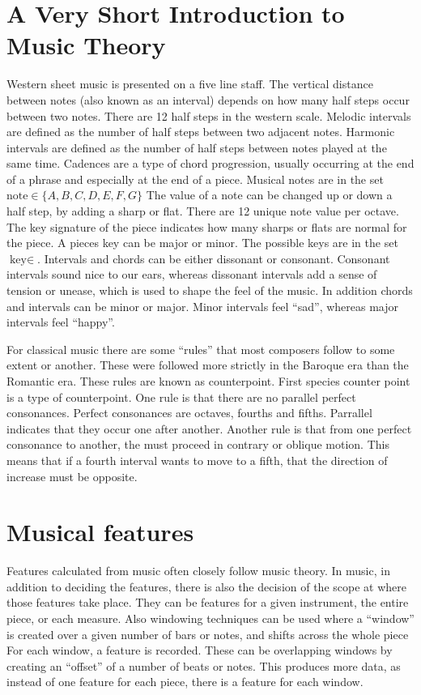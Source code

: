 \documentclass[12pt,twoside]{reedthesis}
\theoremstyle{definition}
\theoremstyle{definition}
\theoremstyle{definition}
\theoremstyle{remark}
\begin{document}
\section{A Very Short Introduction to Music
Theory}\label{a-very-short-introduction-to-music-theory}

Western sheet music is presented on a five line staff. The vertical
distance between notes (also known as an interval) depends on how many
half steps occur between two notes. There are 12 half steps in the
western scale. Melodic intervals are defined as the number of half steps
between two adjacent notes. Harmonic intervals are defined as the number
of half steps between notes played at the same time. Cadences are a type
of chord progression, usually occurring at the end of a phrase and
especially at the end of a piece. Musical notes are in the set
\(\text{note} \in \{A,B,C,D,E,F,G\}\) The value of a note can be changed
up or down a half step, by adding a sharp or flat. There are 12 unique
note value per octave. The key signature of the piece indicates how many
sharps or flats are normal for the piece. A pieces key can be major or
minor. The possible keys are in the set \(\text{key} \in {}\). Intervals
and chords can be either dissonant or consonant. Consonant intervals
sound nice to our ears, whereas dissonant intervals add a sense of
tension or unease, which is used to shape the feel of the music. In
addition chords and intervals can be minor or major. Minor intervals
feel ``sad'', whereas major intervals feel ``happy''.

For classical music there are some ``rules'' that most composers follow
to some extent or another. These were followed more strictly in the
Baroque era than the Romantic era. These rules are known as
counterpoint. First species counter point is a type of counterpoint. One
rule is that there are no parallel perfect consonances. Perfect
consonances are octaves, fourths and fifths. Parrallel indicates that
they occur one after another. Another rule is that from one perfect
consonance to another, the must proceed in contrary or oblique motion.
This means that if a fourth interval wants to move to a fifth, that the
direction of increase must be opposite.

\section{Musical features}\label{musical-features}

Features calculated from music often closely follow music theory. In
music, in addition to deciding the features, there is also the decision
of the scope at where those features take place. They can be features
for a given instrument, the entire piece, or each measure. Also
windowing techniques can be used where a ``window'' is created over a
given number of bars or notes, and shifts across the whole piece For
each window, a feature is recorded. These can be overlapping windows by
creating an ``offset'' of a number of beats or notes. This produces more
data, as instead of one feature for each piece, there is a feature for
each window.
\end{document}
